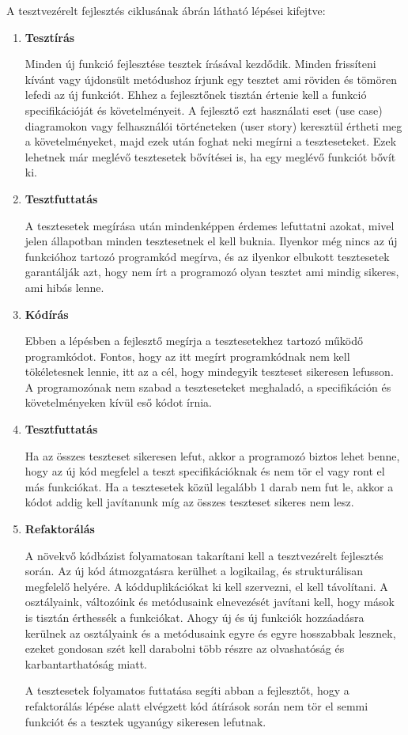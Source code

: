 A tesztvezérelt fejlesztés ciklusának  ábrán látható lépései kifejtve: \cite{beck_2003_tdd}
\begin{enumerate}
    \item \textbf{Tesztírás}

          Minden új funkció fejlesztése tesztek írásával kezdődik. Minden frissíteni kívánt vagy újdonsült metódushoz írjunk egy tesztet ami röviden és tömören lefedi az új funkciót. Ehhez a fejlesztőnek tisztán értenie kell a funkció specifikációját és követelményeit. A fejlesztő ezt használati eset (use case) diagramokon vagy felhasználói történeteken (user story) keresztül értheti meg a követelményeket, majd ezek után foghat neki megírni a teszteseteket. Ezek lehetnek már meglévő tesztesetek bővítései is, ha egy meglévő funkciót bővít ki.

    \item \textbf{Tesztfuttatás}

          A tesztesetek megírása után mindenképpen érdemes lefuttatni azokat, mivel jelen állapotban minden tesztesetnek el kell buknia. Ilyenkor még nincs az új funkcióhoz tartozó programkód megírva, és az ilyenkor elbukott tesztesetek garantálják azt, hogy nem írt a programozó olyan tesztet ami mindig sikeres, ami hibás lenne.

    \item \textbf{Kódírás}

          Ebben a lépésben a fejlesztő megírja a tesztesetekhez tartozó működő programkódot. Fontos, hogy az itt megírt programkódnak nem kell tökéletesnek lennie, itt az a cél, hogy mindegyik teszteset sikeresen lefusson. A programozónak nem szabad a teszteseteket meghaladó, a specifikáción és követelményeken kívül eső kódot írnia.

    \item \textbf{Tesztfuttatás}

          Ha az összes teszteset sikeresen lefut, akkor a programozó biztos lehet benne, hogy az új kód megfelel a teszt specifikációknak és nem tör el vagy ront el más funkciókat. Ha a tesztesetek közül legalább 1 darab nem fut le, akkor a kódot addig kell javítanunk míg az összes teszteset sikeres nem lesz.

    \item \textbf{Refaktorálás}

          A növekvő kódbázist folyamatosan takarítani kell a tesztvezérelt fejlesztés során. Az új kód átmozgatásra kerülhet a logikailag, és strukturálisan megfelelő helyére. A kódduplikációkat ki kell szervezni, el kell távolítani. A osztályaink, változóink és metódusaink elnevezését javítani kell, hogy mások is tisztán érthessék a funkciókat. Ahogy új és új funkciók hozzáadásra kerülnek az osztályaink és a metódusaink egyre és egyre hosszabbak lesznek, ezeket gondosan szét kell darabolni több részre az olvashatóság és karbantarthatóság miatt.

          A tesztesetek folyamatos futtatása segíti abban a fejlesztőt, hogy a refaktorálás lépése alatt elvégzett kód átírások során nem tör el semmi funkciót és a tesztek ugyanúgy sikeresen lefutnak.
\end{enumerate}

